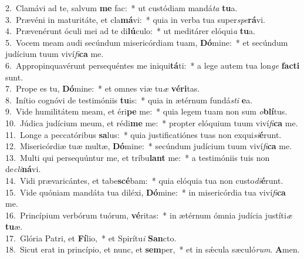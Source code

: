 {2.~}Clamávi ad te, salvum \textbf{me} fac:~* ut custódiam mandá\textit{ta} \textbf{tu}a.\\
{3.~}Prævéni in maturitáte, et cla\textbf{má}vi:~* quia in verba tua super\textit{spe}\textbf{rá}vi.\\
{4.~}Prævenérunt óculi mei ad te di\textbf{lú}culo:~* ut meditárer elóqui\textit{a} \textbf{tu}a.\\
{5.~}Vocem meam audi secúndum misericórdiam tuam, \textbf{Dó}mine:~* et secúndum judícium tuum viví\textit{fi}\textbf{ca} me.\\
{6.~}Appropinquavérunt persequéntes me iniqui\textbf{tá}ti:~* a lege autem tua lon\textit{ge} \textbf{fa}\textbf{cti} sunt.\\
{7.~}Prope es tu, \textbf{Dó}mine:~* et omnes viæ tu\textit{æ} \textbf{vé}\textbf{ri}tas.\\
{8.~}Inítio cognóvi de testimóniis \textbf{tu}is:~* quia in ætérnum fundá\textit{sti} \textbf{e}a.\\
{9.~}Vide humilitátem meam, et éri\textbf{pe} me:~* quia legem tuam non sum \textit{o}\textbf{blí}tus.\\
{10.~}Júdica judícium meum, et rédi\textbf{me} me:~* propter elóquium tuum viví\textit{fi}\textbf{ca} me.\\
{11.~}Longe a peccatóribus \textbf{sa}lus:~* quia justificatiónes tuas non exqui\textit{si}\textbf{é}runt.\\
{12.~}Misericórdiæ tuæ multæ, \textbf{Dó}mine:~* secúndum judícium tuum viví\textit{fi}\textbf{ca} me.\\
{13.~}Multi qui persequúntur me, et tríbu\textbf{lant} me:~* a testimóniis tuis non de\textit{cli}\textbf{ná}vi.\\
{14.~}Vidi prævaricántes, et tabe\textbf{scé}bam:~* quia elóquia tua non custo\textit{di}\textbf{é}runt.\\
{15.~}Vide quóniam mandáta tua diléxi, \textbf{Dó}mine:~* in misericórdia tua viví\textit{fi}\textbf{ca} me.\\
{16.~}Princípium verbórum tuórum, \textbf{vé}ritas:~* in ætérnum ómnia judícia justíti\textit{æ} \textbf{tu}æ.\\
{17.~}Glória Patri, et \textbf{Fí}lio,~* et Spirítu\textit{i} \textbf{San}cto.\\
{18.~}Sicut erat in princípio, et nunc, et \textbf{sem}per,~* et in sǽcula sæculó\textit{rum}. \textbf{A}men.\\
